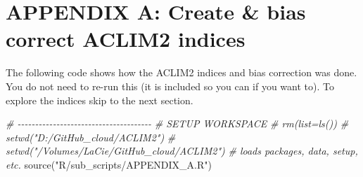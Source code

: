 \documentclass[
]{article}
\newenvironment{Shaded}{\begin{snugshade}}{\end{snugshade}}
\newcommand{\AttributeTok}[1]{\textcolor[rgb]{0.77,0.63,0.00}{#1}}
\newcommand{\CommentTok}[1]{\textcolor[rgb]{0.56,0.35,0.01}{\textit{#1}}}
\newcommand{\ConstantTok}[1]{\textcolor[rgb]{0.00,0.00,0.00}{#1}}
\newcommand{\DecValTok}[1]{\textcolor[rgb]{0.00,0.00,0.81}{#1}}
\newcommand{\FunctionTok}[1]{\textcolor[rgb]{0.00,0.00,0.00}{#1}}
\newcommand{\NormalTok}[1]{#1}
\newcommand{\SpecialCharTok}[1]{\textcolor[rgb]{0.00,0.00,0.00}{#1}}
\newcommand{\StringTok}[1]{\textcolor[rgb]{0.31,0.60,0.02}{#1}}
\begin{document}
\begin{Shaded}
\end{Shaded}

\hypertarget{appendix-a-create-bias-correct-aclim2-indices}{%
\section{APPENDIX A: Create \& bias correct ACLIM2
indices}\label{appendix-a-create-bias-correct-aclim2-indices}}

The following code shows how the ACLIM2 indices and bias correction was
done. You do not need to re-run this (it is included so you can if you
want to). To explore the indices skip to the next section.

\begin{Shaded}
\begin{Highlighting}[]
  \CommentTok{\# {-}{-}{-}{-}{-}{-}{-}{-}{-}{-}{-}{-}{-}{-}{-}{-}{-}{-}{-}{-}{-}{-}{-}{-}{-}{-}{-}{-}{-}{-}{-}{-}{-}{-}{-}{-}{-}{-}}
  \CommentTok{\# SETUP WORKSPACE}
  \CommentTok{\# rm(list=ls())}
  \CommentTok{\# setwd("D:/GitHub\_cloud/ACLIM2")}
  \CommentTok{\# setwd("/Volumes/LaCie/GitHub\_cloud/ACLIM2")}
  \CommentTok{\# loads packages, data, setup, etc.}
  \FunctionTok{source}\NormalTok{(}\StringTok{"R/sub\_scripts/APPENDIX\_A.R"}\NormalTok{)}
\end{Highlighting}
\end{Shaded}
\end{document}
